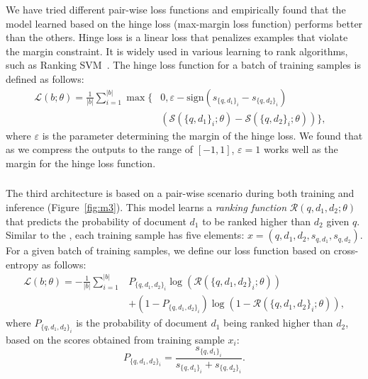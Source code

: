 We have tried different pair-wise loss functions and empirically found that the model learned based on the hinge loss (max-margin loss function) performs better than the others. 
Hinge loss is a linear loss that penalizes examples that violate the margin constraint. It is widely used in various learning to rank algorithms, such as Ranking SVM~\citep{Herbrich:1999}. The hinge loss function for a batch of training samples is defined as follows:
\begin{equation}
\begin{aligned}
\mathcal{L}(b; \theta) = \frac{1}{|b|}
\sum_{i=1}^{|b|}
\max\big\{
& 
0, \varepsilon - \text{sign}
(s_{\{q, d_1\}_i} - s_{\{q, d_2\}_i})
& \\ & 
\left(\mathcal{S}\left(\{q, d_1\}_i; \theta\right) -\mathcal{S}\left(\{q, d_2\}_i; \theta\right)\right)
\big\}
, 
\end{aligned}     
\end{equation}
where $\varepsilon$ is the parameter determining the margin of the hinge loss. We found that as we compress the outputs to the range of $[-1, 1]$, $\varepsilon=1$ works well as the margin for the hinge loss function.

\subsubsection{\label{sec:modelthree}\ModelThree}
The third architecture is based on a pair-wise scenario during both training and inference (Figure~\ref{fig:m3}). This model learns a \emph{ranking function} $\mathcal{R}(q, d_1, d_2; \theta)$ that predicts the probability of document $d_1$ to be ranked higher than $d_2$ given $q$.
Similar to the \modeltwo, each training sample has five elements: $x = (q,d_1, d_2, s_{q,d_1}, s_{q,d_2})$.
For a given batch of training samples, we define our loss function based on cross-entropy as follows:
\begin{align}
\mathcal{L}(b; \theta) = -\frac{1}{|b|}
\sum_{i=1}^{|b|} &
P_{\{q,d_1,d_2\}_i} \log(\mathcal{R}(\{q,d_1,d_2\}_i; \theta)) \\
&
+ (1- P_{\{q,d_1,d_2\}_i})\log(1- \mathcal{R}(\{q,d_1,d_2\}_i; \theta)), \nonumber
\end{align}
where $P_{\{q,d_1,d_2\}_i}$ is the probability of document $d_1$ being ranked higher than $d_2$, based on the scores obtained from training sample $x_i$:
\begin{equation}
P_{\{q,d_1,d_2\}_i} = \frac{s_{\{q,d_1\}_i}}{s_{\{q,d_1\}_i} + s_{\{q,d_2\}_i}}.
\end{equation}

